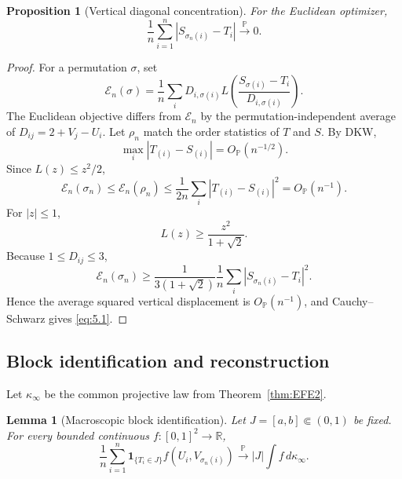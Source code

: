 \documentclass[11pt,reqno]{amsart}
\newtheorem{lemma}[theorem]{Lemma}
\newtheorem{proposition}[theorem]{Proposition}
\theoremstyle{definition}
\theoremstyle{remark}
\numberwithin{equation}{section}
\newcommand{\R}{\mathbb R}
\newcommand{\Pp}{\mathbb P}
\begin{document}
\begin{proposition}[Vertical diagonal concentration]
\label{prop:vd}
For the Euclidean optimizer,
\begin{equation}
\boxed{
\frac1n\sum_{i=1}^n|S_{\sigma_n(i)}-T_i|
\xrightarrow{\Pp}0.
}
\label{eq:5.1}
\end{equation}
\end{proposition}

\begin{proof}
For a permutation \(\sigma\), set
\[
\mathcal E_n(\sigma)
=
\frac1n\sum_i
D_{i,\sigma(i)}
L\left(\frac{S_{\sigma(i)}-T_i}{D_{i,\sigma(i)}}\right).
\]
The Euclidean objective differs from \(\mathcal E_n\) by the
permutation-independent average of \(D_{ij}=2+V_j-U_i\).  Let \(\rho_n\)
match the order statistics of \(T\) and \(S\).  By DKW,
\[
\max_i|T_{(i)}-S_{(i)}|=O_{\Pp}(n^{-1/2}).
\]
Since \(L(z)\le z^2/2\),
\[
\mathcal E_n(\sigma_n)
\le \mathcal E_n(\rho_n)
\le \frac1{2n}\sum_i|T_{(i)}-S_{(i)}|^2
=O_{\Pp}(n^{-1}).
\]
For \(|z|\le1\),
\[
L(z)\ge \frac{z^2}{1+\sqrt2}.
\]
Because \(1\le D_{ij}\le3\),
\[
\mathcal E_n(\sigma_n)
\ge
\frac{1}{3(1+\sqrt2)}
\frac1n\sum_i|S_{\sigma_n(i)}-T_i|^2.
\]
Hence the average squared vertical displacement is \(O_{\Pp}(n^{-1})\),
and Cauchy--Schwarz gives \eqref{eq:5.1}.
\end{proof}

\subsection{Block identification and reconstruction}

Let \(\kappa_\infty\) be the common projective law from Theorem~\ref{thm:EFE2}.

\begin{lemma}[Macroscopic block identification]
\label{lem:block-comp}
Let \(J=[a,b]\Subset(0,1)\) be fixed.
For every bounded continuous \(f:[0,1]^2\to\R\),
\begin{equation}
\frac1n\sum_{i=1}^n
\mathbf 1_{\{T_i\in J\}}
f(U_i,V_{\sigma_n(i)})
\xrightarrow{\Pp}
|J|\int f\,d\kappa_\infty .
\label{eq:6.1}
\end{equation}
\end{lemma}
\end{document}
